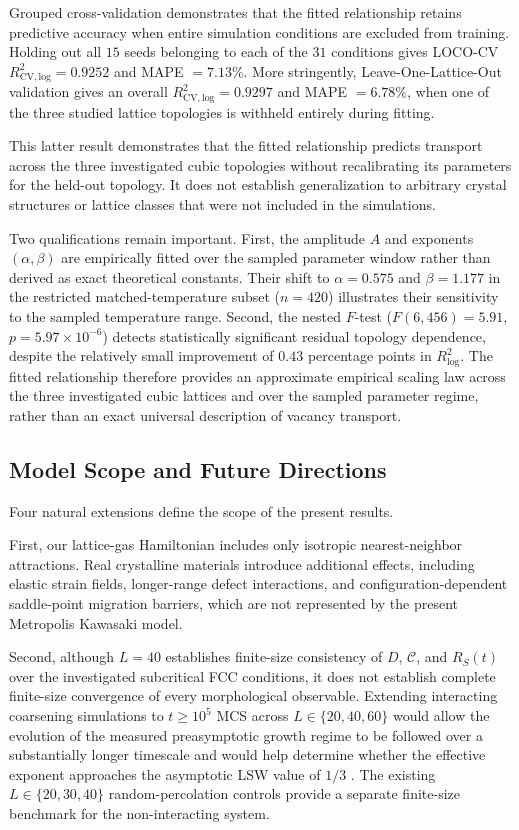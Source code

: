 \documentclass[aps,pre,reprint,superscriptaddress,amsmath,amssymb,floatfix]{revtex4-2}
\begin{document}
Grouped cross-validation demonstrates that the fitted relationship retains predictive accuracy when entire simulation conditions are excluded from training. Holding out all $15$ seeds belonging to each of the $31$ conditions gives LOCO-CV $R^2_{\mathrm{CV,log}}=0.9252$ and MAPE $=7.13\%$. More stringently, Leave-One-Lattice-Out validation gives an overall $R^2_{\mathrm{CV,log}}=0.9297$ and MAPE $=6.78\%$, when one of the three studied lattice topologies is withheld entirely during fitting.

This latter result demonstrates that the fitted relationship predicts transport across the three investigated cubic topologies without recalibrating its parameters for the held-out topology. It does not establish generalization to arbitrary crystal structures or lattice classes that were not included in the simulations.

Two qualifications remain important. First, the amplitude $A$ and exponents $(\alpha,\beta)$ are empirically fitted over the sampled parameter window rather than derived as exact theoretical constants. Their shift to $\alpha=0.575$ and $\beta=1.177$ in the restricted matched-temperature subset ($n=420$) illustrates their sensitivity to the sampled temperature range. Second, the nested $F$-test ($F(6,456)=5.91$, $p=5.97\times10^{-6}$) detects statistically significant residual topology dependence, despite the relatively small improvement of $0.43$ percentage points in $R^2_{\log}$. The fitted relationship therefore provides an approximate empirical scaling law across the three investigated cubic lattices and over the sampled parameter regime, rather than an exact universal description of vacancy transport.

\subsection{Model Scope and Future Directions}
\label{sec:limitations}

Four natural extensions define the scope of the present results.

First, our lattice-gas Hamiltonian includes only isotropic nearest-neighbor attractions. Real crystalline materials introduce additional effects, including elastic strain fields, longer-range defect interactions, and configuration-dependent saddle-point migration barriers, which are not represented by the present Metropolis Kawasaki model.

Second, although $L=40$ establishes finite-size consistency of $D$, $\mathcal{C}$, and $R_S(t)$ over the investigated subcritical FCC conditions, it does not establish complete finite-size convergence of every morphological observable. Extending interacting coarsening simulations to $t\geq10^5$ MCS across $L\in\{20,40,60\}$ would allow the evolution of the measured preasymptotic growth regime to be followed over a substantially longer timescale and would help determine whether the effective exponent approaches the asymptotic LSW value of $1/3$ \cite{Huse1986,Majumder2011}. The existing $L\in\{20,30,40\}$ random-percolation controls provide a separate finite-size benchmark for the non-interacting system.
\end{document}
